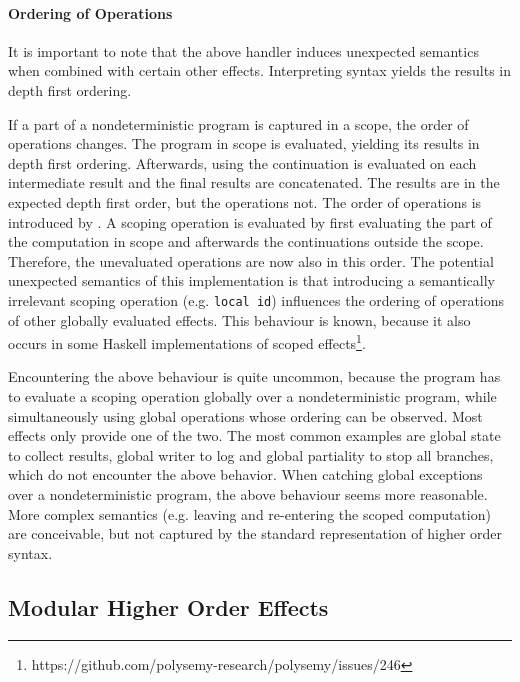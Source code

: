\paragraph{Ordering of Operations}
It is important to note that the above handler induces unexpected semantics when
combined with certain other effects.
Interpreting  syntax yields the results in depth first
ordering.

If a part of a nondeterministic program is captured in a scope, the order of
operations changes.
The program in scope is evaluated, yielding its results in depth first ordering.
Afterwards, using  the continuation is evaluated on each
intermediate result and the final results are concatenated.
The results are in the expected depth first order, but the operations not.
The order of operations is introduced by \AgdaFunction{>>=}.
A scoping operation is evaluated by first evaluating the part of the computation
in scope and afterwards the continuations outside the scope.
Therefore, the unevaluated operations are now also in this order.
The potential unexpected semantics of this implementation is that introducing a
semantically irrelevant scoping operation (e.g. \texttt{local id}) influences
the ordering of operations of other globally evaluated effects.
This behaviour is known, because it also occurs in some Haskell implementations
of scoped
effects\footnote{https://github.com/polysemy-research/polysemy/issues/246}.

Encountering the above behaviour is quite uncommon, because the program has to
evaluate a scoping operation globally over a nondeterministic program, while
simultaneously using global operations whose ordering can be observed.
Most effects only provide one of the two.
The most common examples are global state to collect results, global writer to
log and global partiality to stop all branches, which do not encounter the above
behavior.
When catching global exceptions over a nondeterministic program, the above
behaviour seems more reasonable.
More complex semantics (e.g. leaving and re-entering the scoped computation) are
conceivable, but not captured by the standard representation of higher order
syntax.


\subsection{Modular Higher Order Effects}

